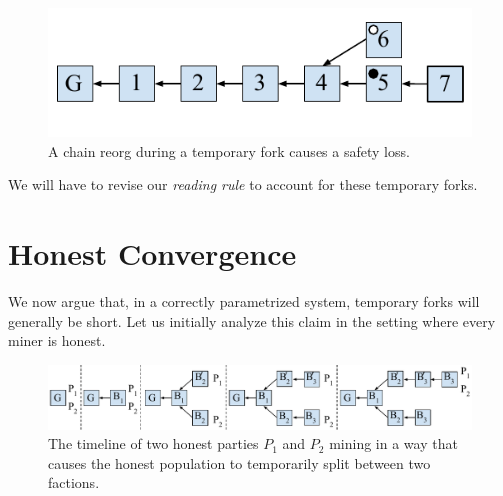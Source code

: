 \begin{figure}[h]
    \centering
    \includegraphics[width=0.5 \columnwidth,keepaspectratio]{figures/reorg-safety-loss.pdf}
    \caption{A chain reorg during a temporary fork causes a safety loss.}
    \label{fig.reorg-safety-loss}
\end{figure}

We will have to revise our \emph{reading rule} to account for these temporary forks.

\section{Honest Convergence}
We now argue that, in a correctly parametrized system, temporary forks will generally be short.
Let us initially analyze this claim in the setting where every miner is honest.

\begin{figure}[h]
    \centering
    \includegraphics[width=\columnwidth,keepaspectratio]{figures/mining-factions.pdf}
    \caption{The timeline of two honest parties $P_1$ and $P_2$ mining in a way that causes
             the honest population to temporarily split between two factions.}
    \label{fig.mining-factions}
\end{figure}

